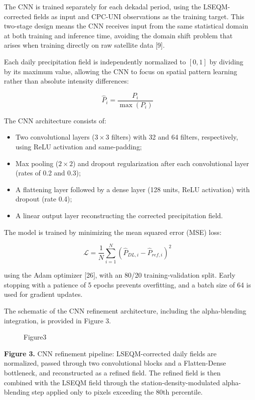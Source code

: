 \documentclass[
]{article}
\makeatletter
\newcommand*\pandocbounded[1]{%
  \sbox\pandoc@box{#1}%
  \Gscale@div\@tempa{\textheight}{\dimexpr\ht\pandoc@box+\dp\pandoc@box\relax}%
  \Gscale@div\@tempb{\linewidth}{\wd\pandoc@box}%
  \ifdim\@tempb\p@<\@tempa\p@\let\@tempa\@tempb\fi%
  \ifdim\@tempa\p@<\p@\scalebox{\@tempa}{\usebox\pandoc@box}%
  \else\usebox{\pandoc@box}%
  \fi%
}
\providecommand{\tightlist}{%
  \setlength{\itemsep}{0pt}\setlength{\parskip}{0pt}}
\makeatother
\begin{document}
The CNN is trained separately for each dekadal period, using the
LSEQM-corrected fields as input and CPC-UNI observations as the training
target. This two-stage design means the CNN receives input from the same
statistical domain at both training and inference time, avoiding the
domain shift problem that arises when training directly on raw satellite
data {[}9{]}.

Each daily precipitation field is independently normalized to \([0, 1]\)
by dividing by its maximum value, allowing the CNN to focus on spatial
pattern learning rather than absolute intensity differences:

\[\hat{P}_{i} = \frac{P_{i}}{\max(P_{i})}\]

The CNN architecture consists of:

\begin{itemize}
\tightlist
\item
  Two convolutional layers (\(3 \times 3\) filters) with 32 and 64
  filters, respectively, using ReLU activation and same-padding;
\item
  Max pooling (\(2 \times 2\)) and dropout regularization after each
  convolutional layer (rates of 0.2 and 0.3);
\item
  A flattening layer followed by a dense layer (128 units, ReLU
  activation) with dropout (rate 0.4);
\item
  A linear output layer reconstructing the corrected precipitation
  field.
\end{itemize}

The model is trained by minimizing the mean squared error (MSE) loss:

\[\mathcal{L} = \frac{1}{N} \sum_{i=1}^{N} \left( \hat{P}_{DL,i} - \hat{P}_{ref,i} \right)^2\]

using the Adam optimizer {[}26{]}, with an 80/20 training-validation
split. Early stopping with a patience of 5 epochs prevents overfitting,
and a batch size of 64 is used for gradient updates.

The schematic of the CNN refinement architecture, including the
alpha-blending integration, is provided in Figure 3.

\begin{figure}
\centering
\pandocbounded{}
\caption{Figure3}
\end{figure}

\textbf{Figure 3.} CNN refinement pipeline: LSEQM-corrected daily fields
are normalized, passed through two convolutional blocks and a
Flatten-Dense bottleneck, and reconstructed as a refined field. The
refined field is then combined with the LSEQM field through the
station-density-modulated alpha-blending step applied only to pixels
exceeding the 80th percentile.
\end{document}
